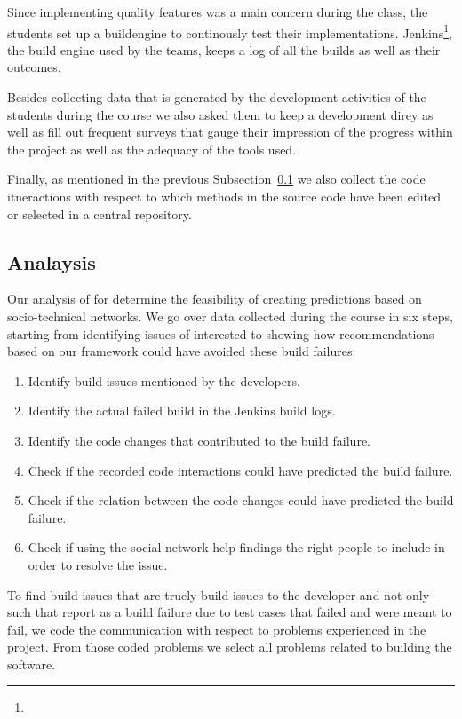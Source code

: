 Since implementing quality features was a main concern during the class, the students set up a buildengine to continously test their implementations.
Jenkins\footnote{}, the build engine used by the teams, keeps a log of all the builds as well as their outcomes.

Besides collecting data that is generated by the development activities of the students during the course we also asked them to keep a development direy as well as fill out frequent surveys that gauge their impression of the progress within the project as well as the adequacy of the tools used.

Finally, as mentioned in the previous Subsection~\ref{} we also collect the code itneractions with respect to which methods in the source code have been edited or selected in a central repository.

\subsection{Analaysis}
Our analysis of for determine the feasibility of creating predictions based on socio-technical networks.
We go over data collected during the course in six steps, starting from identifying issues of interested to showing how recommendations based on our framework could have avoided these build failures:

\begin{enumerate}
\item Identify build issues mentioned by the developers.
\item Identify the actual failed build in the Jenkins build logs.
\item Identify the code changes that contributed to the build failure.
\item Check if the recorded code interactions could have predicted the build failure.
\item Check if the relation between the code changes could have predicted the build failure.
\item Check if using the social-network help findings the right people to include in order to resolve the issue.
\end{enumerate}

To find build issues that are truely build issues to the developer and not only such that report as a build failure due to test cases that failed and were meant to fail, we code the communication with respect to problems experienced in the project.
From those coded problems we select all problems related to building the software.

